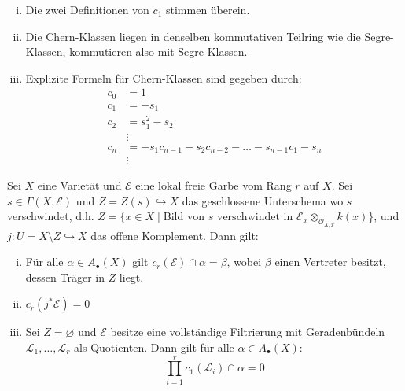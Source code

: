 \documentclass[10pt,b5paper]{article}
\begin{document}
\begin{remark}
\begin{enumerate}[(i)]
\item Die zwei Definitionen von $c_1$ stimmen überein.
\item Die Chern-Klassen liegen in denselben kommutativen Teilring wie die Segre-Klassen, kommutieren also mit Segre-Klassen.
\item Explizite Formeln für Chern-Klassen sind gegeben durch:
\begin{align*}
c_0 &= 1\\
c_1 &= -s_1\\
c_2 &= s_1^2 - s_2\\
&\vdots\\
c_n &= -s_1c_{n-1}-s_2c_{n-2}-\ldots -s_{n-1}c_1-s_n\\
&\vdots
\end{align*}
\end{enumerate}
\end{remark}

\begin{lemma}
Sei $X$ eine Varietät und $\mathcal{E}$ eine lokal freie Garbe vom Rang $r$ auf $X$. Sei $s\in\Gamma(X,\mathcal{E})$ und $Z=Z(s)\hookrightarrow X$ das geschlossene Unterschema wo $s$ verschwindet, d.h. $Z=\{x\in X\mid\text{Bild von $s$ verschwindet in $\mathcal{E}_x \otimes_{\mathcal{O}_{X,x}} k(x)$} \}$, und $j:U=X\setminus Z\hookrightarrow X$ das offene Komplement. Dann gilt:
\begin{enumerate}[(i)]
\item Für alle $\alpha\in A_\bullet(X)$ gilt $c_r(\mathcal{E})\cap\alpha = \beta$, wobei $\beta$ einen Vertreter besitzt, dessen Träger in $Z$ liegt.
\item $c_r(j^\ast\mathcal{E}) = 0$
\item Sei $Z=\varnothing$ und $\mathcal{E}$ besitze eine vollständige Filtrierung mit Geradenbündeln $\mathcal{L}_1,\ldots,\mathcal{L}_r$ als Quotienten. Dann gilt für alle $\alpha\in A_\bullet(X)$:
\[ \prod_{i=1}^r c_1(\mathcal{L}_i)\cap\alpha = 0 \]
\end{enumerate}
\end{lemma}
\end{document}
